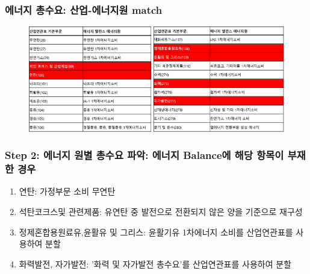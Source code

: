 \documentclass[10pt,compress,slidetop,%
			   hyperref={unicode},xcolor={svgnames},%
			   t]{beamer}
\begin{document}

\begin{frame}
	\frametitle{에너지 총수요: 산업-에너지원 match}
	  	\begin{figure}
	\centering
	 \includegraphics[width=1.00\textwidth]{match.png}
	\end{figure}	
\end{frame}

%
\begin{frame}
	\frametitle{Step 2: 에너지 원별 총수요 파악: 에너지 Balance에 해당 항목이 부재한 경우}	
	\begin{enumerate}
	\item{연탄: 가정부문 소비 무연탄 }
	\item{석탄코크스및 관련제품: 유연탄 중 발전으로 전환되지 않은 양을 기준으로 재구성 }
	\item{정제혼합용원료유,윤활유 및 그리스: 윤활기유 1차에너지 소비를 산업연관표를 사용하여 분할}
	\item{화력발전, 자가발전: '화력 및 자가발전 총수요'를 산업연관표를 사용하여 분할}
	\end{enumerate}
\end{frame}
%
\end{document}
